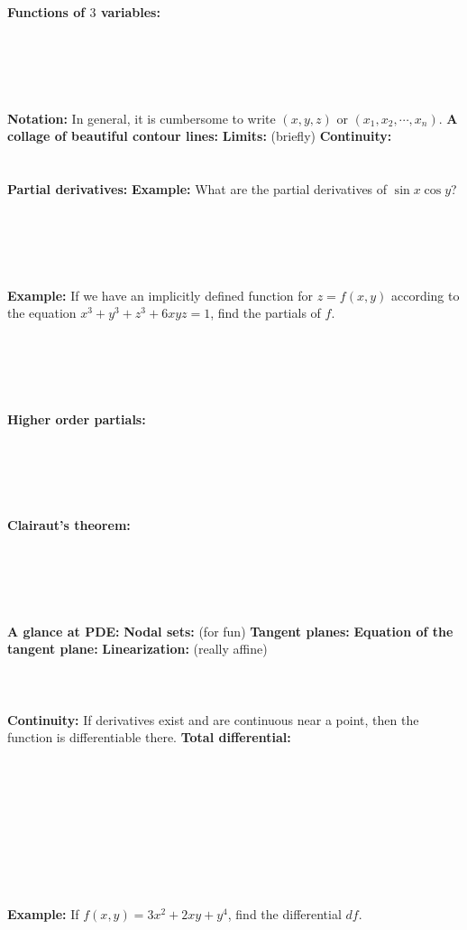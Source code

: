 \documentclass[11pt]{article}
\newcommand{\1}{\mathds{1}}
\theoremstyle{definition}
\theoremstyle{remark}
\newcommand{\dd}{\\ \\ \\ \noindent}
\newcommand{\dds}{\\ \\ \\ \\ \\ \\ \noindent}
\newcommand{\al}{\noindent}
\newcommand{\ex}{\al \textbf{Example:} }
\newcommand{\np}{\newpage \al}
\begin{document}
	\textbf{Functions of $3$ variables:}
	\dds
	\textbf{Notation:} In general, it is cumbersome to write $(x,y,z)$ or $(x_1, x_2, \cdots, x_n)$.
	\np
	\textbf{A collage of beautiful contour lines:}
	\np
	\textbf{Limits:} (briefly)
	\textbf{Continuity:}
	\dd
	\textbf{Partial derivatives:}
\np
	\ex What are the partial derivatives of $\sin x \cos y$?
	\dds
	\ex If we have an implicitly defined function for $z = f(x,y)$ according to the equation $x^3 + y^3 + z^3 + 6xyz = 1$, find the partials of $f$.
	\dds
	\textbf{Higher order partials:}
	\dds
	\textbf{Clairaut's theorem:}
	\dds
	\textbf{A glance at PDE:}
	\np
	\textbf{Nodal sets:} (for fun)
\np
	\textbf{Tangent planes:}
	\textbf{Equation of the tangent plane:}
	\textbf{Linearization:} (really affine)
	\\ \dd
	\textbf{Continuity:} If derivatives exist and are continuous near a point, then the function is differentiable there.
	\np
	\textbf{Total differential:}\dds\\\\
	\\
	\\
	\ex If $f(x,y) = 3x^2 + 2xy + y^4$, find the differential $df$.
	
\end{document}
